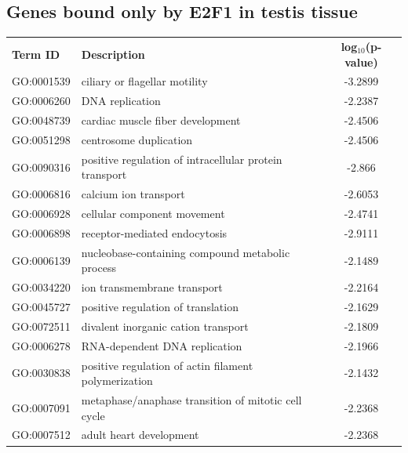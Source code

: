 \documentclass[11pt,twoside,a4paper]{report}
\begin{document}
\begin{appendices}
	\section{Genes bound only by E2F1 in testis tissue}
	\footnotesize  %
	\begin{longtable}{@{\extracolsep{\fill}}llc@{}}
	\textbf{Term ID}  & \textbf{Description}                            & \textbf{log$_{10}$(p-value)} \\
    GO:0001539 & ciliary or flagellar motility                          & -3.2899       \\
    GO:0006260 & DNA replication                                        & -2.2387       \\
    GO:0048739 & cardiac muscle fiber development                       & -2.4506       \\
    GO:0051298 & centrosome duplication                                 & -2.4506       \\
    GO:0090316 & positive regulation of intracellular protein transport & -2.866        \\
    GO:0006816 & calcium ion transport                                  & -2.6053       \\
    GO:0006928 & cellular component movement                            & -2.4741       \\
    GO:0006898 & receptor-mediated endocytosis                          & -2.9111       \\
    GO:0006139 & nucleobase-containing compound metabolic process       & -2.1489       \\
    GO:0034220 & ion transmembrane transport                            & -2.2164       \\
    GO:0045727 & positive regulation of translation                     & -2.1629       \\
    GO:0072511 & divalent inorganic cation transport                    & -2.1809       \\
    GO:0006278 & RNA-dependent DNA replication                          & -2.1966       \\
    GO:0030838 & positive regulation of actin filament polymerization   & -2.1432       \\
    GO:0007091 & metaphase/anaphase transition of mitotic cell cycle    & -2.2368       \\
    GO:0007512 & adult heart development                                & -2.2368       \\
    \end{longtable}
    

\end{appendices}
\end{document}
